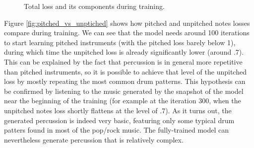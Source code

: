 \documentclass[en]{pracamgr}
\begin{document}
\begin{figure}
    \centering
    \caption{Total loss and its components during training.}
    \label{fig:total}
\end{figure}

Figure \ref{fig:pitched_vs_unptiched} shows how pitched and unpitched notes losses compare during training.
We can see that the model needs around 100 iterations to start learning pitched instruments (with the pitched loss barely below 1), during which time the unpitched loss is already significantly lower (around .7).
This can be explained by the fact that percussion is in general more repetitive than pitched instruments, so it is possible to achieve that level of the unpitched loss by mostly repeating the most common drum patterns.
This hypothesis can be confirmed by listening to the music generated by the snapshot of the model near the beginning of the training (for example at the iteration 300, when the unpitched notes loss shortly flattens at the level of .7).
As it turns out, the generated percussion is indeed very basic, featuring only some typical drum patters found in most of the pop/rock music.
The fully-trained model can nevertheless generate percussion that is relatively complex.
\end{document}
